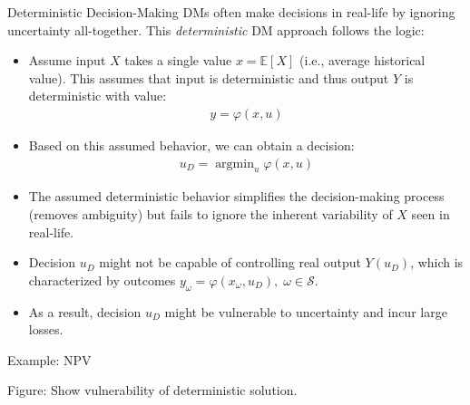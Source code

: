 \documentclass[9pt]{beamer}
\begin{document}
%
\begin{frame}{Deterministic Decision-Making}
DMs often make decisions in real-life by ignoring uncertainty all-together. This {\em deterministic} DM approach follows the logic:
\begin{block}{}
\begin{itemize}
\item Assume input $X$ takes a single value $x={\mathbb{E}}[X]$ (i.e., average historical value). This assumes that input is deterministic and thus output $Y$ is deterministic with value:
\begin{align*}
y=\varphi(x,u)
\end{align*}
\item Based on this assumed behavior, we can obtain a decision: 
\begin{align*}
u_D=\mathop{\textrm{argmin}}_{u}\varphi (x,u)
\end{align*}
\end{itemize}
\end{block}
\begin{itemize}
\item The assumed deterministic behavior simplifies the decision-making process (removes ambiguity) but fails to ignore the inherent variability of $X$ seen in real-life. 

\item Decision $u_D$ might not be capable of controlling real output $Y(u_D)$, which is characterized by outcomes $y_\omega=\varphi(x_\omega,u_D),\; \omega \in \mathcal{S}$. 

\item As a result, decision $u_D$ might be vulnerable to uncertainty and incur large losses. 
\end{itemize}

\end{frame}

%
\begin{frame}{Example: NPV}

\begin{block}{}
Figure: Show vulnerability of deterministic solution. 
\end{block}

\end{frame}

% 
\end{document}
